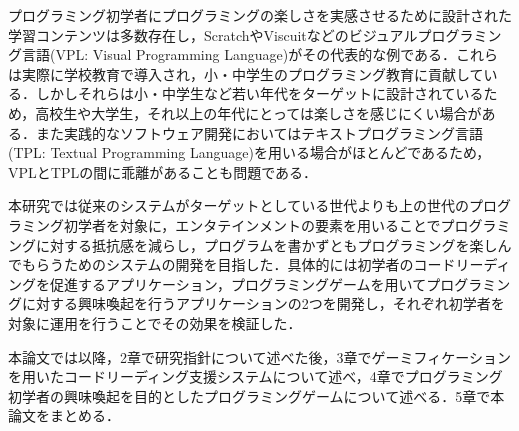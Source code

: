 プログラミング初学者にプログラミングの楽しさを実感させるために設計された学習コンテンツは多数存在し，ScratchやViscuitなどのビジュアルプログラミング言語(VPL: Visual Programming Language)がその代表的な例である．これらは実際に学校教育で導入され，小・中学生のプログラミング教育に貢献している．しかしそれらは小・中学生など若い年代をターゲットに設計されているため，高校生や大学生，それ以上の年代にとっては楽しさを感じにくい場合がある．また実践的なソフトウェア開発においてはテキストプログラミング言語(TPL: Textual Programming Language)を用いる場合がほとんどであるため，VPLとTPLの間に乖離があることも問題である．

本研究では従来のシステムがターゲットとしている世代よりも上の世代のプログラミング初学者を対象に，エンタテインメントの要素を用いることでプログラミングに対する抵抗感を減らし，プログラムを書かずともプログラミングを楽しんでもらうためのシステムの開発を目指した．具体的には初学者のコードリーディングを促進するアプリケーション，プログラミングゲームを用いてプログラミングに対する興味喚起を行うアプリケーションの2つを開発し，それぞれ初学者を対象に運用を行うことでその効果を検証した．


本論文では以降，2章で研究指針について述べた後，3章でゲーミフィケーションを用いたコードリーディング支援システムについて述べ，4章でプログラミング初学者の興味喚起を目的としたプログラミングゲームについて述べる．5章で本論文をまとめる．